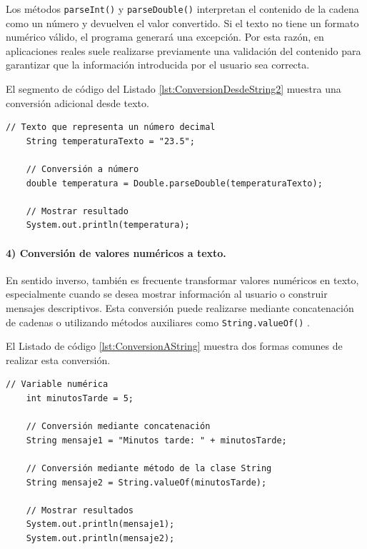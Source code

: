 \documentclass[12pt,twoside]{book}
\begin{document}
						\noindent
						Los métodos \texttt{parseInt()} y \texttt{parseDouble()} interpretan el contenido de la cadena como un número y devuelven el valor convertido. Si el texto no tiene un formato numérico válido, el programa generará una excepción. Por esta razón, en aplicaciones reales suele realizarse previamente una validación del contenido para garantizar que la información introducida por el usuario sea correcta.
						
						El segmento de código del Listado \ref{lst:ConversionDesdeString2} muestra una conversión adicional desde texto.
						
						\begin{lstlisting}[style=Java,caption={Ejemplo adicional de conversión desde String.},label={lst:ConversionDesdeString2}]
	// Texto que representa un número decimal
	String temperaturaTexto = "23.5";
	
	// Conversión a número
	double temperatura = Double.parseDouble(temperaturaTexto);
	
	// Mostrar resultado
	System.out.println(temperatura); \end{lstlisting}
						
						\paragraph{4) Conversión de valores numéricos a texto.}
						En sentido inverso, también es frecuente transformar valores numéricos en texto, especialmente cuando se desea mostrar información al usuario o construir mensajes descriptivos. Esta conversión puede realizarse mediante concatenación de cadenas o utilizando métodos auxiliares como \texttt{String.valueOf()} \cite{Bloch2018EffectiveJava}.
						
						El Listado de código \ref{lst:ConversionAString} muestra dos formas comunes de realizar esta conversión.
						
						\begin{lstlisting}[style=Java,caption={Conversión de números a texto.},label={lst:ConversionAString}]
	// Variable numérica
	int minutosTarde = 5;
	
	// Conversión mediante concatenación
	String mensaje1 = "Minutos tarde: " + minutosTarde;
	
	// Conversión mediante método de la clase String
	String mensaje2 = String.valueOf(minutosTarde);
	
	// Mostrar resultados
	System.out.println(mensaje1);
	System.out.println(mensaje2);
						\end{lstlisting}
						
\end{document}
